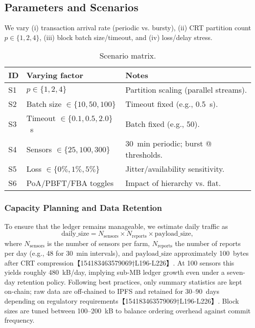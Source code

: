 \subsection{Parameters and Scenarios}
We vary (i) transaction arrival rate (periodic vs. bursty), (ii) CRT partition count $p\in\{1,2,4\}$, (iii) block batch size/timeout, and (iv) loss/delay stress.
\begin{table}[!t]
  \centering
  \caption{Scenario matrix.}
  \label{tab:scenarios}
  \begin{tabular}{lll}
    \toprule
    ID & Varying factor & Notes \\
    \midrule
    S1 & $p\in\{1,2,4\}$ & Partition scaling (parallel streams). \\
    S2 & Batch size $\in\{10,50,100\}$ & Timeout fixed (e.g., 0.5~s). \\
    S3 & Timeout $\in\{0.1,0.5,2.0\}$~s & Batch fixed (e.g., 50). \\
    S4 & Sensors $\in\{25,100,300\}$ & 30~min periodic; burst @ thresholds. \\
    S5 & Loss $\in\{0\%,1\%,5\%\}$ & Jitter/availability sensitivity. \\
    S6 & PoA/PBFT/FBA toggles & Impact of hierarchy vs. flat. \\
    \bottomrule
  \end{tabular}
\end{table}

\subsubsection{Capacity Planning and Data Retention}
To ensure that the ledger remains manageable, we estimate daily traffic as
\begin{equation}
  \text{daily\_size} = N_{\text{sensors}} \times N_{\text{reports}} \times \text{payload\_size},
\end{equation}
where $N_{\text{sensors}}$ is the number of sensors per farm, $N_{\text{reports}}$ the number of reports per day (e.g., 48 for 30~min intervals), and $\text{payload\_size}$ approximately 100~bytes after CRT compression【154183463579069†L196-L226】.  At 100 sensors this yields roughly 480~kB/day, implying sub-MB ledger growth even under a seven-day retention policy.  Following best practices, only summary statistics are kept on-chain; raw data are off-chained to IPFS and retained for 30–90~days depending on regulatory requirements【154183463579069†L196-L226】.  Block sizes are tuned between 100–200~kB to balance ordering overhead against commit frequency.

